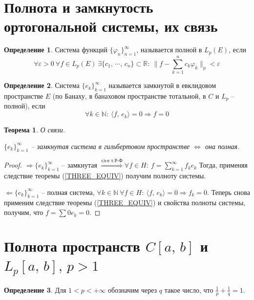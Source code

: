 \documentclass[a4paper,12pt]{article}
\renewcommand{\phi}{\ensuremath{\varphi}}
\theoremstyle{plain}
\newtheorem{theorem}{Теорема}[section]
\theoremstyle{definition}
\newtheorem{definition}{Определение}[section]
\theoremstyle{remark}
\begin{document}
\section{Полнота и замкнутость ортогональной системы, их связь}
\begin{definition}
	Система функций $\{\phi_n\}_{n = 1}^\infty$, называется полной в $L_p(E)$, если
	\[\forall \varepsilon > 0 \: \forall f \in L_p(E)\: \exists \{c_1,\,\cdots,\,c_n\} \subset \mathbb{R}:\: \|f - \sum_{k = 1}^n c_k\phi_k\|_p < \varepsilon\]
\end{definition}

\begin{definition}
	Система $\{e_k\}_{k = 1}^\infty$ называется замкнутой в евклидовом пространстве $E$ (по Банаху, в банаховом пространстве тотальной, в $C$ и $L_p$ -- полной), если 
	\[\forall k \in \mathbb{N}:\: \langle f,\, e_k\rangle = 0 \Rightarrow f = 0\]
\end{definition}

\begin{theorem}
	О связи.

	$\{e_k\}_{k = 1}^\infty$ -- замкнутая система в гильбертовом пространстве $\Leftrightarrow$ она полная.
\end{theorem}

\begin{proof}
	$\Rightarrow \{e_k\}_{k = 1}^\infty$ -- замкнутая $\stackrel{\text{сл-е т.Р-Ф}}{\Rightarrow} \forall f \in H:\: f = \sum_{k = 1}^\infty f_ke_k$
	Тогда, применяя следствие теоремы (\ref{THREE_EQUIV}) получим полноту системы.

	$\Leftarrow \{e_k\}_{k = 1}^\infty$ -- полная система, $\forall k \in \mathbb{N} \: \forall f \in H:\: \langle f,\,e_k\rangle = 0 \Rightarrow f_k = 0$. Теперь снова применим следствие теоремы (\ref{THREE_EQUIV}) и свойства полноты системы, получим, что $f = \sum 0e_k = 0$.
\end{proof}

\section{Полнота пространств $C[a,\,b]$ и $L_p[a,\,b],\, p > 1$}
\begin{definition}
	Для $1 < p < +\infty$ обозначим через $q$ такое число, что $\frac{1}{p} + \frac{1}{q} = 1$.
\end{definition}
\end{document}
